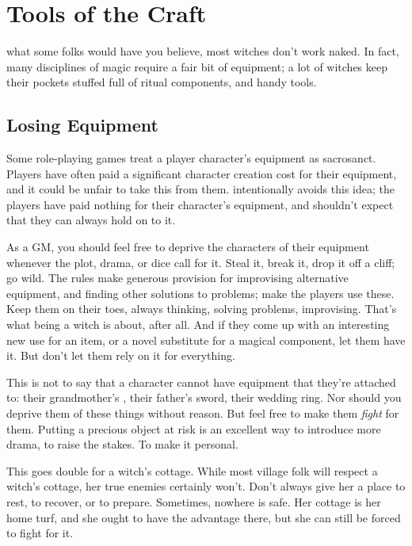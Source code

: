 \chapter{Tools of the Craft}

 what some folks would have you believe, most witches don't work naked.
In fact, many disciplines of magic require a fair bit of equipment; a lot of witches keep their pockets stuffed full of ritual components, and handy tools.



\section{Losing Equipment}

Some role-playing games treat a player character's equipment as sacrosanct.
Players have often paid a significant character creation cost for their equipment, and it could be unfair to take this from them.
 intentionally avoids this idea; the players have paid nothing for their character's equipment, and shouldn't expect that they can always hold on to it.

As a GM, you should feel free to deprive the characters of their equipment whenever the plot, drama, or dice call for it.
Steal it, break it, drop it off a cliff; go wild.
The rules make generous provision for improvising alternative equipment, and finding other solutions to problems; make the players use these.
Keep them on their toes, always thinking, solving problems, improvising.
That's what being a witch is about, after all.
And if they come up with an interesting new use for an item, or a novel substitute for a magical component, let them have it.
But don't let them rely on it for everything.

This is not to say that a character cannot have equipment that they're attached to: their grandmother's , their father's sword, their wedding ring.
Nor should you deprive them of these things without reason.
But feel free to make them \emph{fight} for them.
Putting a precious object at risk is an excellent way to introduce more drama, to raise the stakes.
To make it personal.

This goes double for a witch's cottage.
While most village folk will respect a witch's cottage, her true enemies certainly won't.
Don't always give her a place to rest, to recover, or to prepare.
Sometimes, nowhere is safe.
Her cottage is her home turf, and she ought to have the advantage there, but she can still be forced to fight for it.




